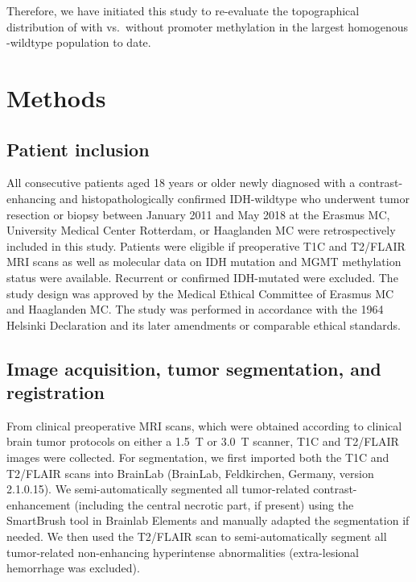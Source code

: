 Therefore, we have initiated this study to re-evaluate the topographical distribution of  with vs.\ without  promoter methylation in the largest homogenous -wildtype  population to date.

\section{Methods}
\subsection{Patient inclusion}

All consecutive patients aged 18 years or older newly diagnosed with a contrast-enhancing and histopathologically confirmed  \gls{IDH}-wildtype who underwent \gls{tumor} resection or biopsy between January 2011 and May 2018 at the Erasmus MC, University Medical Center Rotterdam, or Haaglanden MC were retrospectively included in this study.
Patients were eligible if preoperative  \gls{T1C} and \gls{T2}/\gls{FLAIR} \gls{MRI} scans as well as molecular data on \gls{IDH} mutation and \gls{MGMT} methylation status were available.
Recurrent  or confirmed \gls{IDH}-mutated  were excluded.
The study design was approved by the Medical Ethical Committee of Erasmus MC and Haaglanden MC\@.
The study was performed in accordance with the 1964 Helsinki Declaration and its later amendments or comparable ethical standards.

\subsection{Image acquisition, \gls{tumor} segmentation, and registration}
From clinical preoperative \gls{MRI} scans, which were obtained according to clinical brain \gls{tumor} protocols on either a \SI{1.5}{\tesla} or \SI{3.0}{\tesla} scanner, \gls{T1C} and \gls{T2}/\gls{FLAIR} images were collected.
For  segmentation, we first imported both the \gls{T1C} and \gls{T2}/\gls{FLAIR} scans into BrainLab (BrainLab, Feldkirchen, Germany, version 2.1.0.15).
We semi-automatically segmented all \gls{tumor}-related contrast-enhancement (including the central necrotic part, if present) using the SmartBrush tool in Brainlab Elements and manually adapted the segmentation if needed.
We then used the \gls{T2}/\gls{FLAIR} scan to semi-automatically segment all \gls{tumor}-related non-enhancing hyperintense abnormalities (extra-lesional hemorrhage was excluded).

